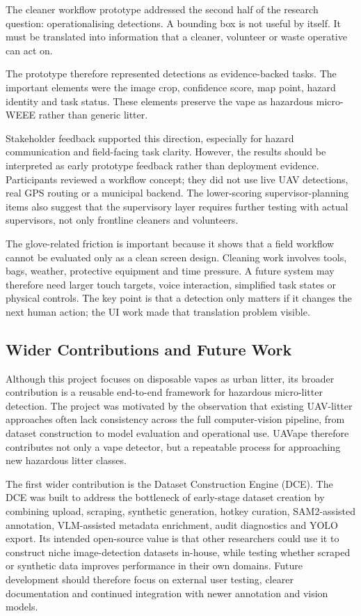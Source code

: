 The cleaner workflow prototype addressed the second half of the research question: operationalising detections. A bounding box is not useful by itself. It must be translated into information that a cleaner, volunteer or waste operative can act on.

The prototype therefore represented detections as evidence-backed tasks. The important elements were the image crop, confidence score, map point, hazard identity and task status. These elements preserve the vape as hazardous micro-WEEE rather than generic litter.

Stakeholder feedback supported this direction, especially for hazard communication and field-facing task clarity. However, the results should be interpreted as early prototype feedback rather than deployment evidence. Participants reviewed a workflow concept; they did not use live UAV detections, real GPS routing or a municipal backend. The lower-scoring supervisor-planning items also suggest that the supervisory layer requires further testing with actual supervisors, not only frontline cleaners and volunteers.

The glove-related friction is important because it shows that a field workflow cannot be evaluated only as a clean screen design. Cleaning work involves tools, bags, weather, protective equipment and time pressure. A future system may therefore need larger touch targets, voice interaction, simplified task states or physical controls. The key point is that a detection only matters if it changes the next human action; the UI work made that translation problem visible.

\subsection{Wider Contributions and Future Work}

Although this project focuses on disposable vapes as urban litter, its broader contribution is a reusable end-to-end framework for hazardous micro-litter detection. The project was motivated by the observation that existing UAV-litter approaches often lack consistency across the full computer-vision pipeline, from dataset construction to model evaluation and operational use. UAVape therefore contributes not only a vape detector, but a repeatable process for approaching new hazardous litter classes.

The first wider contribution is the Dataset Construction Engine (DCE). The DCE was built to address the bottleneck of early-stage dataset creation by combining upload, scraping, synthetic generation, hotkey curation, SAM2-assisted annotation, VLM-assisted metadata enrichment, audit diagnostics and YOLO export. Its intended open-source value is that other researchers could use it to construct niche image-detection datasets in-house, while testing whether scraped or synthetic data improves performance in their own domains. Future development should therefore focus on external user testing, clearer documentation and continued integration with newer annotation and vision models.

